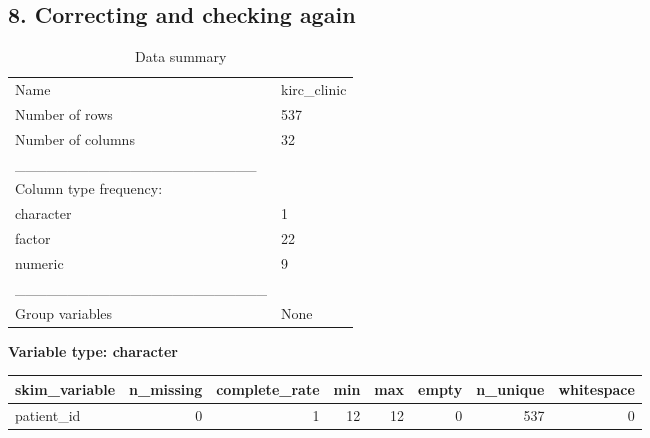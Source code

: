 \documentclass[]{article}
\newenvironment{Shaded}{\begin{snugshade}}{\end{snugshade}}
\newcommand{\KeywordTok}[1]{\textcolor[rgb]{0.13,0.29,0.53}{\textbf{#1}}}
\newcommand{\DataTypeTok}[1]{\textcolor[rgb]{0.13,0.29,0.53}{#1}}
\newcommand{\DecValTok}[1]{\textcolor[rgb]{0.00,0.00,0.81}{#1}}
\newcommand{\StringTok}[1]{\textcolor[rgb]{0.31,0.60,0.02}{#1}}
\newcommand{\CommentTok}[1]{\textcolor[rgb]{0.56,0.35,0.01}{\textit{#1}}}
\newcommand{\OperatorTok}[1]{\textcolor[rgb]{0.81,0.36,0.00}{\textbf{#1}}}
\newcommand{\NormalTok}[1]{#1}
\begin{document}
\begin{Shaded}
\end{Shaded}

\subsection{8. Correcting and checking
again}\label{correcting-and-checking-again}

\begin{Shaded}
\end{Shaded}

\begin{longtable}[]{@{}ll@{}}
\caption{Data summary}\tabularnewline
\toprule
Name & kirc\_clinic\tabularnewline
Number of rows & 537\tabularnewline
Number of columns & 32\tabularnewline
\_\_\_\_\_\_\_\_\_\_\_\_\_\_\_\_\_\_\_\_\_\_\_ &\tabularnewline
Column type frequency: &\tabularnewline
character & 1\tabularnewline
factor & 22\tabularnewline
numeric & 9\tabularnewline
\_\_\_\_\_\_\_\_\_\_\_\_\_\_\_\_\_\_\_\_\_\_\_\_ &\tabularnewline
Group variables & None\tabularnewline
\bottomrule
\end{longtable}

\textbf{Variable type: character}

\begin{longtable}[]{@{}lrrrrrrr@{}}
\toprule
skim\_variable & n\_missing & complete\_rate & min & max & empty &
n\_unique & whitespace\tabularnewline
\midrule
\endhead
patient\_id & 0 & 1 & 12 & 12 & 0 & 537 & 0\tabularnewline
\bottomrule
\end{longtable}
\end{document}
